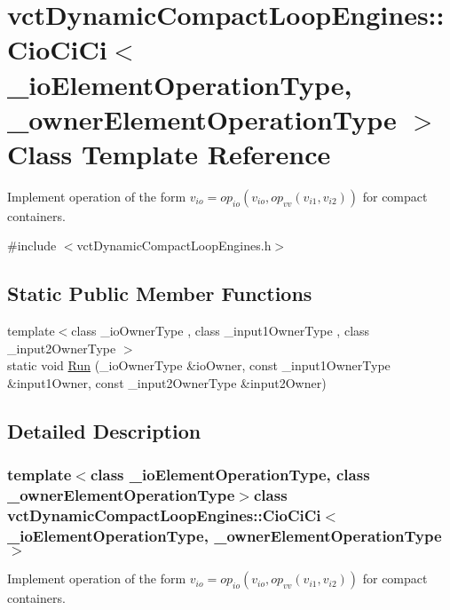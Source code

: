 \hypertarget{classvct_dynamic_compact_loop_engines_1_1_cio_ci_ci}{}\section{vct\+Dynamic\+Compact\+Loop\+Engines\+:\+:Cio\+Ci\+Ci$<$ \+\_\+io\+Element\+Operation\+Type, \+\_\+owner\+Element\+Operation\+Type $>$ Class Template Reference}
\label{classvct_dynamic_compact_loop_engines_1_1_cio_ci_ci}


Implement operation of the form $v_{io} = op_{io}(v_{io}, op_{vv}(v_{i1}, v_{i2}))$ for compact containers.  




{\ttfamily \#include $<$vct\+Dynamic\+Compact\+Loop\+Engines.\+h$>$}

\subsection*{Static Public Member Functions}
\begin{DoxyCompactItemize}
\item 
{\footnotesize template$<$class \+\_\+io\+Owner\+Type , class \+\_\+input1\+Owner\+Type , class \+\_\+input2\+Owner\+Type $>$ }\\static void \hyperlink{classvct_dynamic_compact_loop_engines_1_1_cio_ci_ci_a65af76c1d75a6929e31317868542ba40}{Run} (\+\_\+io\+Owner\+Type \&io\+Owner, const \+\_\+input1\+Owner\+Type \&input1\+Owner, const \+\_\+input2\+Owner\+Type \&input2\+Owner)
\end{DoxyCompactItemize}


\subsection{Detailed Description}
\subsubsection*{template$<$class \+\_\+io\+Element\+Operation\+Type, class \+\_\+owner\+Element\+Operation\+Type$>$class vct\+Dynamic\+Compact\+Loop\+Engines\+::\+Cio\+Ci\+Ci$<$ \+\_\+io\+Element\+Operation\+Type, \+\_\+owner\+Element\+Operation\+Type $>$}

Implement operation of the form $v_{io} = op_{io}(v_{io}, op_{vv}(v_{i1}, v_{i2}))$ for compact containers. 

